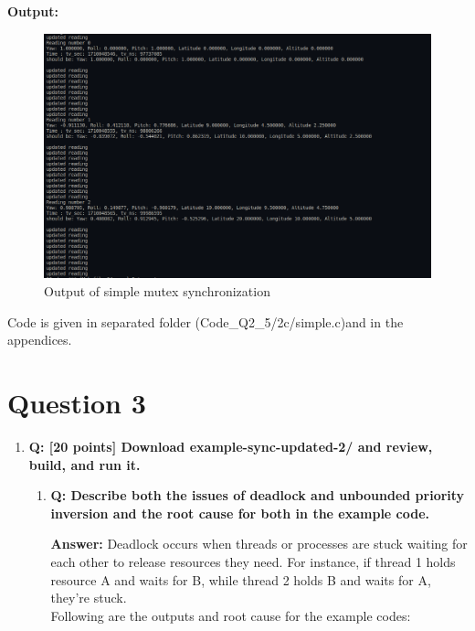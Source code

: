 \documentclass[a4paper,11pt]{article}%
\newenvironment{qanda}{\setlength{\parindent}{0pt}}{\bigskip}
\newcommand{\Q}{\bigskip\bfseries Q: }
\newcommand{\A}{\par\textbf{Answer: } \normalfont}
\begin{document}
\begin{qanda}
\begin{enumerate}
\begin{enumerate}
				      

				      

					  \textbf{Output:}

					  \begin{figure}[H]
						\centering
						\includegraphics[scale=0.45]{figures/simple.png}
						\caption{Output of simple mutex synchronization}
					\end{figure}

					  Code is given in separated folder (Code\_Q2\_5/2c/simple.c)and in the appendices.

			\end{enumerate}


	\end{enumerate}




	\section{Question 3}
	\begin{enumerate}
		\item[] \Q [20 points] Download example-sync-updated-2/ and review, build, and run it.
			\begin{enumerate}
				\item \Q Describe both the issues of deadlock and unbounded priority inversion and the root cause
				      for both in the example code.
				      \A Deadlock occurs when threads or processes are stuck waiting for each other to release resources they need. For instance, if thread 1 holds resource A and waits for B, while thread 2 holds B and waits for A, they're stuck. \\
				      Following are the outputs and root cause for the example codes:\\


\end{enumerate}
\end{enumerate}
\end{qanda}
\end{document}
